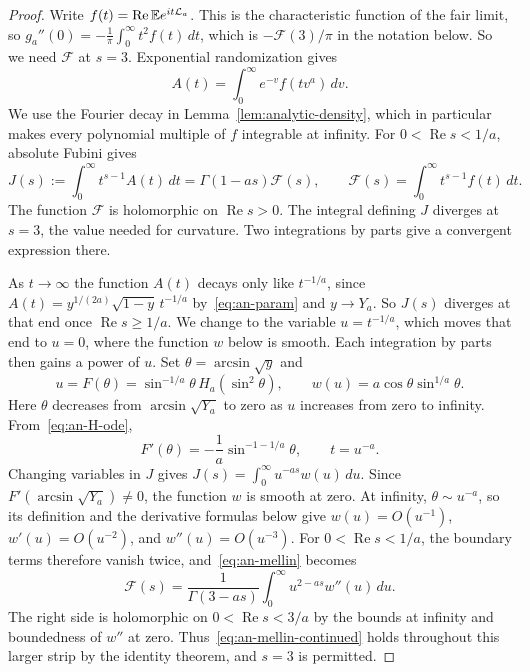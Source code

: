 \begin{proof}
Write $f(t)=\operatorname{Re}\mathbb{E} e^{it\mathcal L_a}$. This is the
characteristic function of the fair limit, so
$g_a''(0)=-\frac1\pi\int_0^\infty t^2f(t)\,dt$, which is
$-\mathcal F(3)/\pi$ in the notation below. So we need $\mathcal F$ at
$s=3$. Exponential randomization gives
\[
 A(t)=\int_0^\infty e^{-v}f(tv^a)\,d v.
\]
We use the Fourier decay in Lemma~\ref{lem:analytic-density},
which in particular makes every polynomial multiple of $f$
integrable at infinity. For $0<\operatorname{Re}s<1/a$, absolute Fubini gives
\begin{equation}\label{eq:an-mellin}
 J(s):=\int_0^\infty t^{s-1}A(t)\,d t
 =\Gamma(1-as)\mathcal F(s),\qquad
 \mathcal F(s)=\int_0^\infty t^{s-1}f(t)\,d t.
\end{equation}
The function $\mathcal F$ is holomorphic on $\operatorname{Re}s>0$.
The integral defining $J$ diverges at $s=3$, the value needed for curvature.
Two integrations by parts give a convergent expression there.

As $t\to\infty$ the function $A(t)$ decays only like $t^{-1/a}$, since
$A(t)=y^{1/(2a)}\sqrt{1-y}\,t^{-1/a}$ by~\eqref{eq:an-param} and
$y\to Y_a$. So $J(s)$ diverges at that end once
$\operatorname{Re}s\ge1/a$. We change to the variable $u=t^{-1/a}$,
which moves that end to $u=0$, where the function $w$ below is smooth.
Each integration by parts then gains a power of $u$. Set $\theta=\arcsin\sqrt y$ and
\[
 u=F(\theta)=\sin^{-1/a}\theta\,H_a(\sin^2\theta),\qquad
 w(u)=a\cos\theta\sin^{1/a}\theta.
\]
Here $\theta$ decreases from $\arcsin\sqrt{Y_a}$ to zero as
$u$ increases from zero to infinity. From~\eqref{eq:an-H-ode},
\[
 F'(\theta)=-\frac1a\sin^{-1-1/a}\theta,\qquad t=u^{-a}.
\]
Changing variables in $J$ gives
$J(s)=\int_0^\infty u^{-as}w(u)\,d u$.
Since $F'(\arcsin\sqrt{Y_a})\ne0$, the function $w$ is smooth
at zero. At infinity, $\theta\sim u^{-a}$, so its definition
and the derivative formulas below give
$w(u)=O(u^{-1})$, $w'(u)=O(u^{-2})$, and $w''(u)=O(u^{-3})$.
For $0<\operatorname{Re}s<1/a$, the boundary terms therefore vanish twice,
and~\eqref{eq:an-mellin} becomes
\begin{equation}\label{eq:an-mellin-continued}
 \mathcal F(s)=\frac{1}{\Gamma(3-as)}
       \int_0^\infty u^{2-as}w''(u)\,d u.
\end{equation}
The right side is holomorphic on $0<\operatorname{Re}s<3/a$ by the bounds
at infinity and boundedness of $w''$ at zero.
Thus~\eqref{eq:an-mellin-continued} holds throughout this larger
strip by the identity theorem, and $s=3$ is permitted.


\end{proof}
